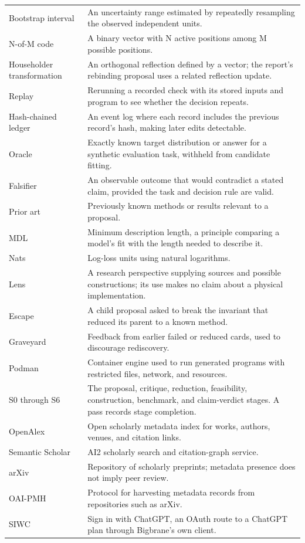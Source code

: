 \begin{longtable}{p{3.3cm}p{10.8cm}}
Bootstrap interval & An uncertainty range estimated by repeatedly resampling the observed independent units. \ \\
N-of-M code & A binary vector with N active positions among M possible positions. \ \\
Householder transformation & An orthogonal reflection defined by a vector; the report's rebinding proposal uses a related reflection update. \ \\
Replay & Rerunning a recorded check with its stored inputs and program to see whether the decision repeats. \ \\
Hash-chained ledger & An event log where each record includes the previous record's hash, making later edits detectable. \ \\
Oracle & Exactly known target distribution or answer for a synthetic evaluation task, withheld from candidate fitting. \\
Falsifier & An observable outcome that would contradict a stated claim, provided the task and decision rule are valid. \\
Prior art & Previously known methods or results relevant to a proposal. \\
MDL & Minimum description length, a principle comparing a model's fit with the length needed to describe it. \\
Nats & Log-loss units using natural logarithms. \\
Lens & A research perspective supplying sources and possible constructions; its use makes no claim about a physical implementation. \\
Escape & A child proposal asked to break the invariant that reduced its parent to a known method. \\
Graveyard & Feedback from earlier failed or reduced cards, used to discourage rediscovery. \\
Podman & Container engine used to run generated programs with restricted files, network, and resources. \\
S0 through S6 & The proposal, critique, reduction, feasibility, construction, benchmark, and claim-verdict stages. A pass records stage completion. \\
OpenAlex & Open scholarly metadata index for works, authors, venues, and citation links. \\
Semantic Scholar & AI2 scholarly search and citation-graph service. \\
arXiv & Repository of scholarly preprints; metadata presence does not imply peer review. \\
OAI-PMH & Protocol for harvesting metadata records from repositories such as arXiv. \\
SIWC & Sign in with ChatGPT, an OAuth route to a ChatGPT plan through Bigbrane's own client. \\
\bottomrule
\end{longtable}


